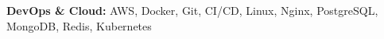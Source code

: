 \textbf{DevOps \& Cloud:} AWS, Docker, Git, CI/CD, Linux, Nginx, PostgreSQL, MongoDB, Redis, Kubernetes
